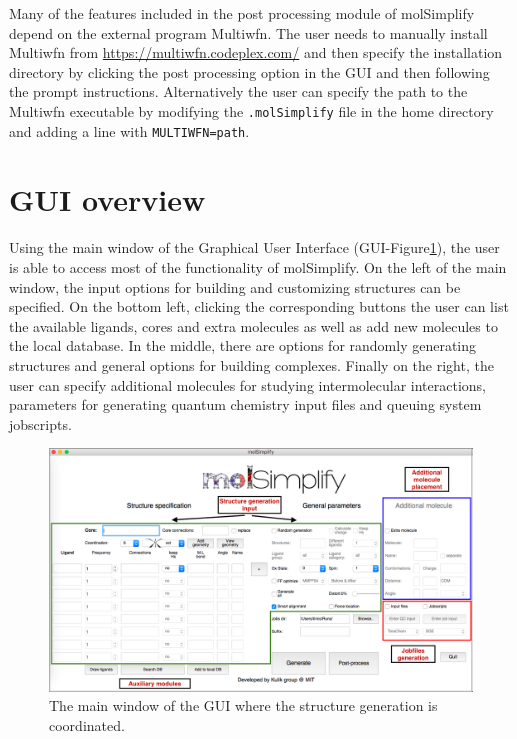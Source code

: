 \documentclass[a4paper,12pt]{assignment}
\begin{document}
Many of the features included in the post processing module of molSimplify depend on the external program Multiwfn. The user needs to manually install Multiwfn from \url{https://multiwfn.codeplex.com/} and then specify the installation directory by clicking the post processing option in the GUI and then following the prompt instructions.  Alternatively the user can specify the path to the Multiwfn executable by modifying the \texttt{.molSimplify} file in the home directory and adding a line with \texttt{MULTIWFN=path}.

\newpage

\section{GUI overview}

Using the main window of the Graphical User Interface (GUI-Figure\ref{GUIov}), the user is able to access most of the functionality of molSimplify. On the left of the main window, the input options for building and customizing structures can be specified. On the bottom left, clicking the corresponding buttons the user can list the available ligands, cores and extra molecules as well as add new molecules to the local database. In the middle, there are options for randomly generating structures and general options for building complexes. Finally on the right, the user can specify additional molecules for studying intermolecular interactions, parameters for generating quantum chemistry input files and queuing system jobscripts.

\begin{figure}[htb!]
\centering
\includegraphics[width=\textwidth]{./Figures/fig0.png}
\caption{The main window of the GUI where the structure generation is coordinated.}
\label{GUIov}
\end{figure}
\end{document}
